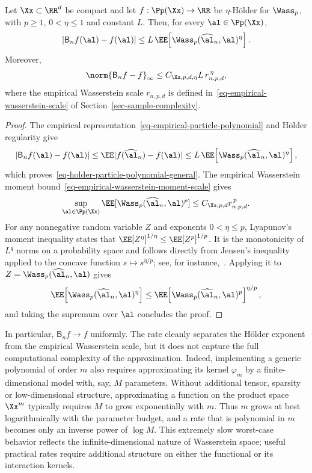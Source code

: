 \begin{prop}\label{prop-holder-particle-polynomial}
	Let \(\Xx\subset\RR^d\) be compact and let \(f:\Pp(\Xx)\to\RR\) be \(\eta\)-H\"older for \(\Wass_p\), with \(p\geq1\), \(0<\eta\leq1\) and constant \(L\). Then, for every \(\al\in\Pp(\Xx)\),
	\begin{equation}\label{eq-holder-particle-polynomial-general}
		\left|\mathsf B_n f(\al)-f(\al)\right|
		\leq
		L\,\EE\!\left[\Wass_p(\widehat\al_n,\al)^\eta\right].
	\end{equation}
	Moreover,
	\begin{equation}\label{eq-holder-particle-polynomial-rate}
		\norm{\mathsf B_n f-f}_{\infty}
		\leq
		C_{\Xx,p,d,\eta}L\,r_{n,p,d}^{\,\eta},
	\end{equation}
	where the empirical Wasserstein scale \(r_{n,p,d}\) is defined in~\eqref{eq-empirical-wasserstein-scale} of Section~\ref{sec-sample-complexity}.
\end{prop}
\begin{proof}
	The empirical representation~\eqref{eq-empirical-particle-polynomial} and H\"older regularity give
	\[
		|\mathsf B_n f(\al)-f(\al)|
		\leq
		\EE|f(\widehat\al_n)-f(\al)|
		\leq
		L\,\EE\!\left[\Wass_p(\widehat\al_n,\al)^\eta\right],
	\]
	which proves~\eqref{eq-holder-particle-polynomial-general}. The empirical Wasserstein moment bound~\eqref{eq-empirical-wasserstein-moment-scale} gives
	\[
		\sup_{\al\in\Pp(\Xx)}\EE[\Wass_p(\widehat\al_n,\al)^p]
		\leq C_{\Xx,p,d}r_{n,p,d}^{\,p}.
	\]
	For any nonnegative random variable \(Z\) and exponents \(0<\eta\leq p\), Lyapunov's moment inequality states that
	\(\EE[Z^\eta]^{1/\eta}\leq\EE[Z^p]^{1/p}\).
	It is the monotonicity of \(L^q\) norms on a probability space and follows directly from Jensen's inequality applied to the concave function \(s\mapsto s^{\eta/p}\); see, for instance,~\cite{bogachev2007measure}. Applying it to \(Z=\Wass_p(\widehat\al_n,\al)\) gives
	\[
		\EE\!\left[\Wass_p(\widehat\al_n,\al)^\eta\right]
		\leq
		\EE\!\left[\Wass_p(\widehat\al_n,\al)^p\right]^{\eta/p},
	\]
	and taking the supremum over \(\al\) concludes the proof.
\end{proof}

In particular, \(\mathsf B_n f\to f\) uniformly. The rate cleanly separates the H\"older exponent from the empirical Wasserstein scale, but it does not capture the full computational complexity of the approximation. Indeed, implementing a generic polynomial of order \(m\) also requires approximating its kernel \(\varphi_m\) by a finite-dimensional model with, say, \(M\) parameters. Without additional tensor, sparsity or low-dimensional structure, approximating a function on the product space \(\Xx^m\) typically requires \(M\) to grow exponentially with \(m\). Thus \(m\) grows at best logarithmically with the parameter budget, and a rate that is polynomial in \(m\) becomes only an inverse power of \(\log M\). This extremely slow worst-case behavior reflects the infinite-dimensional nature of Wasserstein space; useful practical rates require additional structure on either the functional or its interaction kernels.

